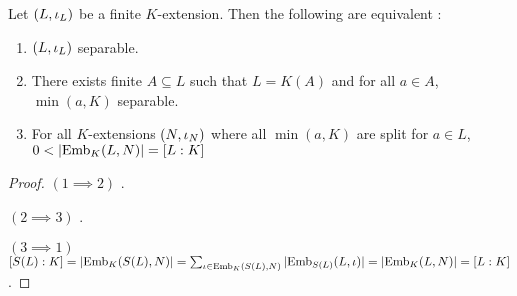 \documentclass[main.tex]{subfiles}
\begin{document}
\begin{thm} 
  
  Let $(L,\iota_L)$ be a finite $K$-extension. 
  Then the following are equivalent : 
  \begin{enumerate}
    \item $(L,\iota_L)$ separable. 
    \item There exists finite $A \subseteq L$ such that 
    $L = K(A)$ and for all $a \in A$, $\min(a,K)$ separable. 
    \item For all $K$-extensions $(N,\iota_N)$ where 
    all $\min(a,K)$ are split for $a \in L$, 
    $0 < |\mathrm{Emb}_{K}(L, N)| = [L : K]$
  \end{enumerate}
\end{thm}
\begin{proof}
  $(1 \implies 2)$ . 
  
  $(2 \implies 3)$ . 

  $(3 \implies 1)$ $[S(L) : K] = |\mathrm{Emb}_{K}(S(L), N)| 
  = \sum_{\iota \in \mathrm{Emb}_{K}(S(L), N)} |\mathrm{Emb}_{S(L)}(L, \iota)| 
  = |\mathrm{Emb}_{K}(L, N)| = [L : K]$.
\end{proof}
\end{document}
